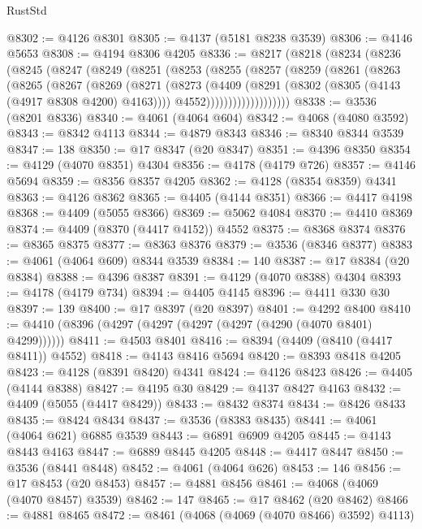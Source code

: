 \begin{lexlean}{RustStd}
\begin{coremodule}
@8302 := @4126 @8301
@8305 := @4137 (@5181 @8238 @3539)
@8306 := @4146 @5653
@8308 := @4194 @8306 @4205
@8336 := @8217
    (@8218
      (@8234
        (@8236
          (@8245
            (@8247
              (@8249
                (@8251
                  (@8253
                    (@8255
                      (@8257
                        (@8259
                          (@8261
                            (@8263
                              (@8265
                                (@8267
                                  (@8269
                                    (@8271
                                      (@8273
                                        (@4409
                                          (@8291 (@8302 (@8305 (@4143 (@4917 @8308 @4200) @4163))))
                                          @4552)))))))))))))))))))
@8338 := @3536 (@8201 @8336)
@8340 := @4061 (@4064 @604)
@8342 := @4068 (@4080 @3592)
@8343 := @8342 @4113
@8344 := @4879 @8343
@8346 := @8340 @8344 @3539
@8347 := 138
@8350 := @17 @8347 (@20 @8347)
@8351 := @4396 @8350
@8354 := @4129 (@4070 @8351) @4304
@8356 := @4178 (@4179 @726)
@8357 := @4146 @5694
@8359 := @8356 @8357 @4205
@8362 := @4128 (@8354 @8359) @4341
@8363 := @4126 @8362
@8365 := @4405 (@4144 @8351)
@8366 := @4417 @4198
@8368 := @4409 (@5055 @8366)
@8369 := @5062 @4084
@8370 := @4410 @8369
@8374 := @4409 (@8370 (@4417 @4152)) @4552
@8375 := @8368 @8374
@8376 := @8365 @8375
@8377 := @8363 @8376
@8379 := @3536 (@8346 @8377)
@8383 := @4061 (@4064 @609) @8344 @3539
@8384 := 140
@8387 := @17 @8384 (@20 @8384)
@8388 := @4396 @8387
@8391 := @4129 (@4070 @8388) @4304
@8393 := @4178 (@4179 @734)
@8394 := @4405 @4145
@8396 := @4411 @330 @30
@8397 := 139
@8400 := @17 @8397 (@20 @8397)
@8401 := @4292 @8400
@8410 := @4410 (@8396 (@4297 (@4297 (@4297 (@4297 (@4290 (@4070 @8401) @4299))))))
@8411 := @4503 @8401
@8416 := @8394 (@4409 (@8410 (@4417 @8411)) @4552)
@8418 := @4143 @8416 @5694
@8420 := @8393 @8418 @4205
@8423 := @4128 (@8391 @8420) @4341
@8424 := @4126 @8423
@8426 := @4405 (@4144 @8388)
@8427 := @4195 @30
@8429 := @4137 @8427 @4163
@8432 := @4409 (@5055 (@4417 @8429))
@8433 := @8432 @8374
@8434 := @8426 @8433
@8435 := @8424 @8434
@8437 := @3536 (@8383 @8435)
@8441 := @4061 (@4064 @621) @6885 @3539
@8443 := @6891 @6909 @4205
@8445 := @4143 @8443 @4163
@8447 := @6889 @8445 @4205
@8448 := @4417 @8447
@8450 := @3536 (@8441 @8448)
@8452 := @4061 (@4064 @626)
@8453 := 146
@8456 := @17 @8453 (@20 @8453)
@8457 := @4881 @8456
@8461 := @4068 (@4069 (@4070 @8457) @3539)
@8462 := 147
@8465 := @17 @8462 (@20 @8462)
@8466 := @4881 @8465
@8472 := @8461 (@4068 (@4069 (@4070 @8466) @3592) @4113)

\end{coremodule}
\end{lexlean}

